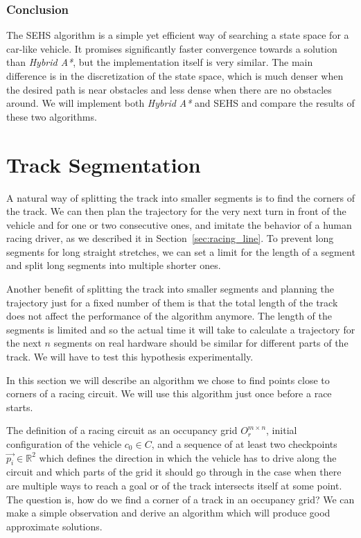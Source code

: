 \subsubsection{Conclusion}

The \gls*{SEHS} algorithm is a simple yet efficient way of searching a state space for a car-like vehicle. It promises significantly faster convergence towards a solution than \textit{Hybrid A*}, but the implementation itself is very similar. The main difference is in the discretization of the state space, which is much denser when the desired path is near obstacles and less dense when there are no obstacles around. We will implement both \textit{Hybrid A*} and \gls*{SEHS} and compare the results of these two algorithms.

\section{Track Segmentation}
\label{sec:track_segmentation}

A natural way of splitting the track into smaller segments is to find the corners of the track. We can then plan the trajectory for the very next turn in front of the vehicle and for one or two  consecutive ones, and imitate the behavior of a human racing driver, as we described it in Section~\ref{sec:racing_line}. To prevent long segments for long straight stretches, we can set a limit for the length of a segment and split long segments into multiple shorter ones.

Another benefit of splitting the track into smaller segments and planning the trajectory just for a fixed number of them is that the total length of the track does not affect the performance of the algorithm anymore. The length of the segments is limited and so the actual time it will take to calculate a trajectory for the next $n$ segments on real hardware should be similar for different parts of the track. We will have to test this hypothesis experimentally.

In this section we will describe an algorithm we chose to find points close to corners of a racing circuit. We will use this algorithm just once before a race starts.

The definition of a racing circuit as an occupancy grid $O_r^{m\times n}$, initial configuration of the vehicle $c_0\in C$, and a sequence of at least two checkpoints $\vec{p_i}\in\mathbb{R}^2$ which defines the direction in which the vehicle has to drive along the circuit and which parts of the grid it should go through in the case when there are multiple ways to reach a goal or of the track intersects itself at some point. The question is, how do we find a corner of a track in an occupancy grid? We can make a simple observation and derive an algorithm which will produce good approximate solutions.

